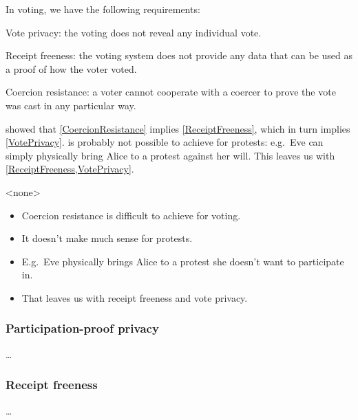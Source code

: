 In voting, we have the following requirements:
\begin{frame}
\begin{requirements}[P]
\item\label{VotePrivacy} Vote privacy: the voting does not reveal any 
  individual vote.
\item\label{ReceiptFreeness} Receipt freeness: the voting system does not 
  provide any data that can be used as a proof of how the voter voted.
\item\label{CoercionResistance} Coercion resistance: a voter cannot cooperate 
  with a coercer to prove the vote was cast in any particular way.
\end{requirements}
\pause{}
\end{frame}
\Textcite{VerifyingPrivacyPropertiesOfVotingProtocols} showed that 
\cref{CoercionResistance} implies \cref{ReceiptFreeness}, which in turn implies
\cref{VotePrivacy}.
 is probably not possible to achieve for protests:
e.g.\ Eve can simply physically bring Alice to a protest against her will.
This leaves us with \cref{ReceiptFreeness,VotePrivacy}.

\mode<none>{%
\begin{frame}
  \begin{remark}
    \begin{itemize}
      \item Coercion resistance is difficult to achieve for voting.
      \item It doesn't make much sense for protests.
      \item E.g.\ Eve physically brings Alice to a protest she doesn't want to 
        participate in.
      \item That leaves us with receipt freeness and vote privacy.
    \end{itemize}
  \end{remark}
\end{frame}
}

\subsubsection{Participation-proof privacy}

\begin{frame}
\begin{definition}
  \dots
\end{definition}
\end{frame}

\subsubsection{Receipt freeness}

\begin{frame}
\begin{definition}
  \dots
\end{definition}
\end{frame}

